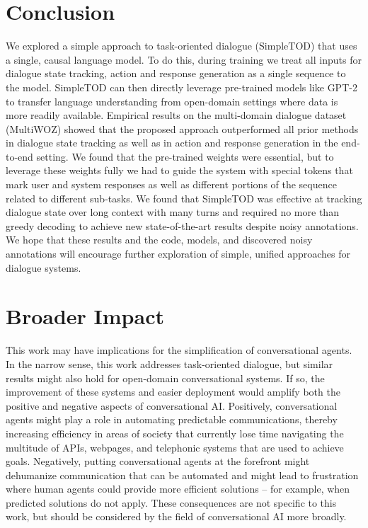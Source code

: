 \documentclass{article}
\begin{document}
 \section{Conclusion}
\label{sec:conclusion}
We explored a simple approach to task-oriented dialogue (SimpleTOD) that uses a single, causal language model. 
To do this, during training we treat all inputs for dialogue state tracking, action and response generation as a single sequence to the model.
SimpleTOD can then directly leverage pre-trained models like GPT-2 to transfer language understanding from open-domain settings where data is more readily available.
Empirical results on the multi-domain dialogue dataset (MultiWOZ) showed that the proposed approach outperformed all prior methods in dialogue state tracking as well as in action and response generation in the end-to-end setting. 
We found that the pre-trained weights were essential, but to leverage these weights fully we had to guide the system with special tokens that mark user and system responses as well as different portions of the sequence related to different sub-tasks.
We found that SimpleTOD was effective at tracking dialogue state over long context with many turns and required no more than greedy decoding to achieve new state-of-the-art results despite noisy annotations.
We hope that these results and the code, models, and discovered noisy annotations 
will encourage further exploration of simple, unified approaches for dialogue systems.

\section{Broader Impact}
\label{sec:broader_impact}
This work may have implications for the simplification of conversational agents. 
In the narrow sense, this work addresses task-oriented dialogue,
but similar results might also hold for open-domain conversational systems.
If so, the improvement of these systems and easier deployment would amplify both the positive and negative aspects of conversational AI.
Positively, conversational agents might play a role in automating predictable communications, thereby increasing efficiency in areas of society that currently lose time navigating the multitude of APIs, webpages, and telephonic systems that are used to achieve goals.
Negatively, putting conversational agents at the forefront might dehumanize communication that can be automated and might lead to frustration where human agents could provide more efficient solutions -- for example, when predicted solutions do not apply.
These consequences are not specific to this work, but should be considered by the field of conversational AI more broadly. \small

\newpage
\end{document}
